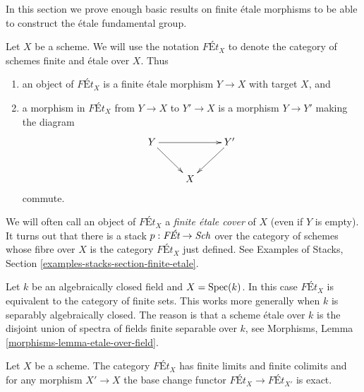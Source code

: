 \noindent
In this section we prove enough basic results on finite \'etale
morphisms to be able to construct the \'etale fundamental group.

\medskip\noindent
Let $X$ be a scheme. We will use the notation $\textit{F\'Et}_X$
to denote the category of schemes finite and \'etale over $X$.
Thus
\begin{enumerate}
\item an object of $\textit{F\'Et}_X$ is a finite \'etale morphism
$Y \to X$ with target $X$, and
\item a morphism in $\textit{F\'Et}_X$
from $Y \to X$ to $Y' \to X$ is a morphism $Y \to Y'$ making
the diagram
$$
\xymatrix{
Y \ar[rr] \ar[rd] & &  Y' \ar[ld] \\
& X
}
$$
commute.
\end{enumerate}
We will often call an object of $\textit{F\'Et}_X$ a
{\it finite \'etale cover} of $X$ (even if $Y$ is empty).
It turns out that there is a stack $p : \textit{F\'Et} \to \mathit{Sch}$
over the category of schemes whose fibre over $X$ is the category
$\textit{F\'Et}_X$ just defined. See Examples of Stacks, Section
\ref{examples-stacks-section-finite-etale}.

\begin{example}
\label{example-finite-etale-geometric-point}
Let $k$ be an algebraically closed field and $X = \mathop{\mathrm{Spec}}(k)$. In this case
$\textit{F\'Et}_X$ is equivalent to the category of finite sets. This works
more generally when $k$ is separably algebraically closed. The reason is
that a scheme \'etale over $k$ is the disjoint union of spectra of
fields finite separable over $k$, see
Morphisms, Lemma \ref{morphisms-lemma-etale-over-field}.
\end{example}

\begin{lemma}
\label{lemma-finite-etale-covers-limits-colimits}
Let $X$ be a scheme. The category $\textit{F\'Et}_X$ has finite limits and
finite colimits and for any morphism $X' \to X$ the base change functor
$\textit{F\'Et}_X \to \textit{F\'Et}_{X'}$ is exact.
\end{lemma}


